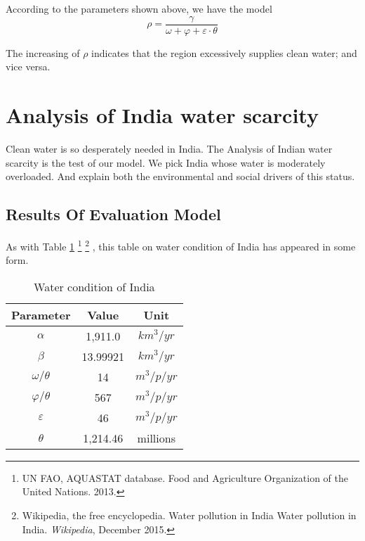 \documentclass[tcn = 45538, sheet = true, abstract = true]{mcmthesis}
\begin{document}
According to the parameters shown above, we have the model
\begin{equation}
\rho = \frac{\gamma}{\omega + \varphi + \varepsilon \cdot \theta }
\label{eq:relation}
\end{equation}

The increasing of $\rho$ indicates that the region excessively supplies clean water; 
and vice versa.

\section{Analysis of India water scarcity}

\hspace{1.5 em} Clean water is so desperately needed in India. 
The Analysis of Indian water scarcity is the test of our model. 
We pick India whose water is moderately overloaded. 
And explain both the environmental and social drivers of this status.

\subsection{Results Of Evaluation Model}

\hspace{1.5 em} As with Table \ref{tab:waterConditionOfIndia}
\footnote{UN FAO, AQUASTAT database. 
Food and Agriculture Organization of the United Nations. 
2013.}
\footnote{Wikipedia, the free encyclopedia. 
Water pollution in India Water pollution in India. 
\emph{Wikipedia}, 
December 2015.}
, this table on water condition of India has appeared in some form. 

\begin{table}[]
\centering
\begin{tabular}{@{}c|c|c@{}}
\toprule
Parameter & Value & Unit \\ \midrule
$\alpha$ & 1,911.0 & $km^3/yr$ \\
$\beta$ & 13.99921 & $km^3/yr$ \\
$\omega / \theta$ & 14 & $m^3/p/yr$ \\
$\varphi / \theta$ & 567 & $m^3/p/yr$ \\
$\varepsilon$ & 46 & $m^3/p/yr$ \\
$\theta$ & 1,214.46 & millions \\ \bottomrule
\end{tabular}
\caption{Water condition of India}
\label{tab:waterConditionOfIndia}
\end{table}
\end{document}
